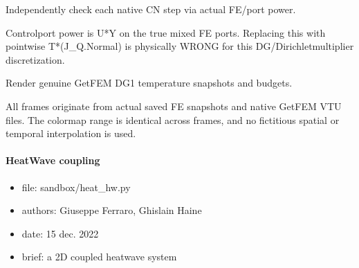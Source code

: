 \documentclass[letterpaper,10pt,english]{sphinxmanual}
\begin{document}
\begin{fulllineitems}

\pysigstartsignatures
\pysiglinewithargsret
{}
{}
{}
\pysigstopsignatures
\end{fulllineitems}



\begin{fulllineitems}

\pysigstartsignatures
\pysiglinewithargsret
{}
{}
{}
\pysigstopsignatures
\sphinxAtStartPar
Independently check each native CN step via actual FE/port power.

\sphinxAtStartPar
Control\sphinxhyphen{}port power is U*Y on the true mixed FE ports. Replacing
this with pointwise T*(J\_Q.Normal) is physically WRONG for this
DG/Dirichlet\sphinxhyphen{}multiplier discretization.

\end{fulllineitems}



\begin{fulllineitems}

\pysigstartsignatures
\pysiglinewithargsret
{}
{\sphinxparamcomma {}\sphinxparamcomma {}\sphinxparamcomma {}}
{}
\pysigstopsignatures
\sphinxAtStartPar
Render genuine GetFEM DG1 temperature snapshots and budgets.

\sphinxAtStartPar
All frames originate from actual saved FE snapshots and native
GetFEM VTU files. The colormap range is identical across frames,
and no fictitious spatial or temporal interpolation is used.

\end{fulllineitems}



\paragraph{Heat\sphinxhyphen{}Wave coupling}
\label{\detokenize{scrimp.examples:heat-wave-coupling}}\begin{itemize}
\item {} 
\sphinxAtStartPar
file:             sandbox/heat\_hw.py

\item {} 
\sphinxAtStartPar
authors:          Giuseppe Ferraro, Ghislain Haine

\item {} 
\sphinxAtStartPar
date:             15 dec. 2022

\item {} 
\sphinxAtStartPar
brief:            a 2D coupled heat\sphinxhyphen{}wave system

\end{itemize}
\end{document}
